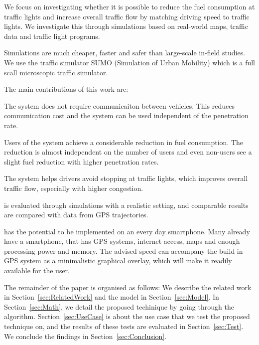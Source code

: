 We focus on investigating whether it is possible to reduce the fuel consumption at traffic lights and increase overall traffic flow by matching driving speed to traffic lights. 
We investigate this through simulations based on real-world maps, traffic data and traffic light programs.

Simulations are much cheaper, faster and safer than large-scale in-field studies. 
We use the traffic simulator SUMO (Simulation of Urban Mobility)\cite{sumo} which is a full scall microscopic traffic simulator.

The main contributions of this work are:
\begin{enumerate*}
\item The system does not require communicaiton between vehicles. This reduces communication cost and the system can be used independent of the penetration rate.
\item Users of the system achieve a considerable reduction in fuel consumption. The reduction is almost independent on the number of users and even non-users see a slight fuel reduction with higher penetration rates.
\item The system helps drivers avoid stopping at traffic lights, which improves overall traffic flow, especially with higher congestion.
\item \tech is evaluated through simulations with a realistic setting, and comparable results are compared with data from GPS trajectories.
\end{enumerate*}

\tech has the potential to be implemented on an every day smartphone. 
Many already have a smartphone, that has GPS systems, internet access, maps and enough processing power and memory.
The advised speed can accompany the build in GPS system as a minimalistic graphical overlay, which will make it readily available for the user.

The remainder of the paper is organised as follows: 
We describe the related work in Section~\ref{sec:RelatedWork} and the model in Section~\ref{sec:Model}. 
In Section~\ref{sec:Math}, we detail the proposed techinique by going through the algorithm.
Section~\ref{sec:UseCase} is about the use case that we test the proposed technique on, and the results of these tests are evaluated in Section~\ref{sec:Test}. 
We conclude the findings in Section~\ref{sec:Conclusion}.




